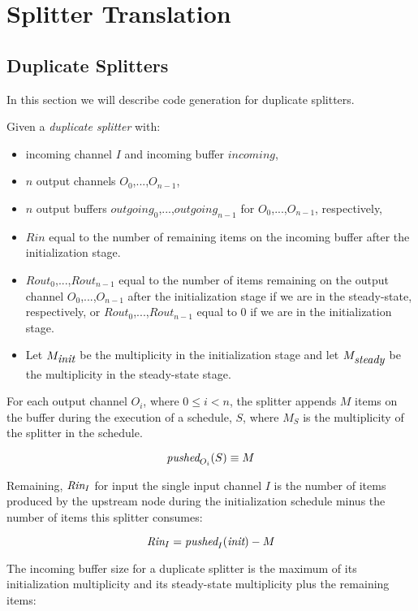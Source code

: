 \documentclass[10pt, letterpaper, onecolumn]{article}
\begin{document}
\section{Splitter Translation}
\label{splitter}
\subsection{Duplicate Splitters}
In this section we will describe code generation for duplicate
splitters.  

Given a {\it duplicate splitter} with:
\begin{itemize}
\item incoming channel $I$ and incoming buffer ${incoming}$,
\item $n$ output channels $O_0$,...,$O_{n-1}$,
\item $n$ output buffers ${outgoing}_0$,...,${outgoing}_{n-1}$ for
  $O_0$,...,$O_{n-1}$, respectively,
\item $Rin$ equal to the number of remaining items on the incoming
  buffer after the initialization stage.
\item ${Rout}_0$,...,${Rout}_{n-1}$ equal to the number of items remaining
  on the output channel $O_0$,...,$O_{n-1}$ after the initialization
  stage if we are in the steady-state, respectively, or
  ${Rout}_0$,...,${Rout}_{n-1}$ equal to $0$ if we are in the
  initialization stage. 
\item Let $M_{\mbox{\it init}}$ be the multiplicity in the initialization
  stage and let $M_{\mbox{\it steady}}$ be the multiplicity in the
  steady-state stage.
\end{itemize}

For each output channel $O_i$, where $0 \le i < n$, the splitter appends
$M$ items on the buffer during the execution of a schedule, $S$, where $M_S$
is the multiplicity of the splitter in the schedule.

\begin{displaymath}
\mbox{\it pushed}_{O_i}(S) \equiv M
\end{displaymath}

Remaining, $\mbox{\it Rin}_I$ for input the single input channel $I$ is the number
of items produced by the upstream node during the initialization
schedule minus the number of items this splitter consumes:

\begin{displaymath}
\mbox{\it Rin}_I = \mbox{\it pushed}_I(\mbox{\it init}) - M
\end{displaymath}

The incoming buffer size for a duplicate splitter is the maximum of
its initialization multiplicity and its steady-state multiplicity plus
the remaining items:
\end{document}
